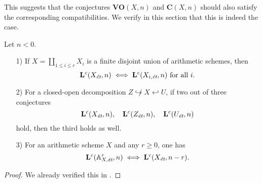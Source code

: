 \documentclass{article}
\numberwithin{equation}{section}
\begin{document}
This suggests that the conjectures $\mathbf{VO} (X,n)$ and $\mathbf{C} (X,n)$
should also satisfy the corresponding compatibilities. We verify in this section
that this is indeed the case.

\begin{lemma}
  \label{lemma:compatibility-of-Lc(X,n)}
  Let $n < 0$.

  \begin{enumerate}
  \item[1)] If $X = \coprod_{1 \le i \le r} X_i$ is a finite disjoint union of
    arithmetic schemes, then
    $$\mathbf{L}^c (X_\et,n) \iff \mathbf{L}^c (X_{i,\et},n)\text{ for all }i.$$

  \item[2)] For a closed-open decomposition
    $Z \not\hookrightarrow X \hookleftarrow U$, if two out of three conjectures
    \[ \mathbf{L}^c (X_\et,n), \quad
      \mathbf{L}^c (Z_\et,n), \quad
      \mathbf{L}^c (U_\et, n) \]
    hold, then the third holds as well.

  \item[3)] For an arithmetic scheme $X$ and any $r \ge 0$, one has
    $$\mathbf{L}^c (\AA^r_{X,\et}, n) \iff \mathbf{L}^c (X_\et, n-r).$$
  \end{enumerate}

  \begin{proof}
    We already verified this in \cite[Lemma~8.7]{Beshenov-Weil-etale-1}.
  \end{proof}
\end{lemma}
\end{document}

